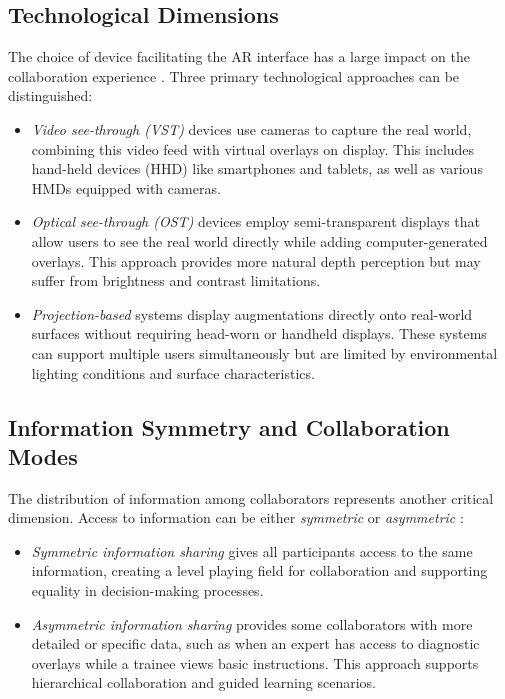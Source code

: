 \subsection{Technological Dimensions}
The choice of device facilitating the AR interface has a large impact on the collaboration experience \cite{samini2021review}. Three primary technological approaches can be distinguished\cite{azuma1997survey}\cite{bimber2005spatial}:

\begin{itemize}
    \item \textit{Video see-through (VST)} devices use cameras to capture the real world, combining this video feed with virtual overlays on display. This includes hand-held devices (HHD) like smartphones and tablets, as well as various HMDs equipped with cameras.
    \item \textit{Optical see-through (OST)} devices employ semi-transparent displays that allow users to see the real world directly while adding computer-generated overlays. This approach provides more natural depth perception but may suffer from brightness and contrast limitations.
    \item \textit{Projection-based} systems display augmentations directly onto real-world surfaces without requiring head-worn or handheld displays. These systems can support multiple users simultaneously but are limited by environmental lighting conditions and surface characteristics.
\end{itemize}

\subsection{Information Symmetry and Collaboration Modes}
The distribution of information among collaborators represents another critical dimension. Access to information can be either \textit{symmetric} or \textit{asymmetric} \cite{feng2023comprehensive}:

\begin{itemize}
    \item \textit{Symmetric information sharing} gives all participants access to the same information, creating a level playing field for collaboration and supporting equality in decision-making processes.
    \item \textit{Asymmetric information sharing} provides some collaborators with more detailed or specific data, such as when an expert has access to diagnostic overlays while a trainee views basic instructions. This approach supports hierarchical collaboration and guided learning scenarios.
\end{itemize}

